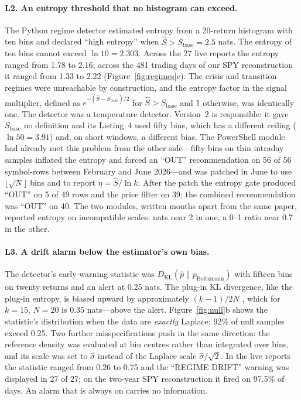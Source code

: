 \documentclass[11pt]{article}
\newcommand{\KL}{D_{\mathrm{KL}}}
\newcommand{\Sb}{S_{\mathrm{base}}}
\begin{document}
\paragraph{L2. An entropy threshold that no histogram can exceed.}
The Python regime detector estimated entropy from a 20-return histogram with ten bins and declared ``high entropy'' when $\hat S>\Sb=2.5$ nats. The entropy of ten bins cannot exceed $\ln10=2.303$. Across the 27 live reports the entropy ranged from 1.78 to 2.16; across the 481 trading days of our SPY reconstruction it ranged from 1.33 to 2.22 (Figure~\ref{fig:regimes}c). The crisis and transition regimes were unreachable by construction, and the entropy factor in the signal multiplier, defined as $e^{-(\hat S-\Sb)/2}$ for $\hat S>\Sb$ and $1$ otherwise, was identically one. The detector was a temperature detector. Version~2 is responsible: it gave $\Sb$ no definition and its Listing~4 used fifty bins, which has a different ceiling ($\ln50=3.91$) and, on short windows, a different bias. The PowerShell module had already met this problem from the other side---fifty bins on thin intraday samples inflated the entropy and forced an ``OUT'' recommendation on 56 of 56 symbol-rows between February and June 2026---and was patched in June to use $\lfloor\sqrt N\rfloor$ bins and to report $\eta=\hat S/\ln k$. After the patch the entropy gate produced ``OUT'' on 5 of 49 rows and the price filter on 39; the combined recommendation was ``OUT'' on 40. The two modules, written months apart from the same paper, reported entropy on incompatible scales: nats near 2 in one, a 0--1 ratio near 0.7 in the other.

\paragraph{L3. A drift alarm below the estimator's own bias.}
The detector's early-warning statistic was $\KL(\hat p\|p_{\mathrm{Boltzmann}})$ with fifteen bins on twenty returns and an alert at 0.25 nats. The plug-in KL divergence, like the plug-in entropy, is biased upward by approximately $(k-1)/2N$ \citep{miller1955,paninski2003}, which for $k=15$, $N=20$ is $0.35$ nats---above the alert. Figure~\ref{fig:null}b shows the statistic's distribution when the data are \emph{exactly} Laplace: 92\% of null samples exceed 0.25. Two further misspecifications push in the same direction: the reference density was evaluated at bin centres rather than integrated over bins, and its scale was set to $\hat\sigma$ instead of the Laplace scale $\hat\sigma/\sqrt2$. In the live reports the statistic ranged from 0.26 to 0.75 and the ``REGIME DRIFT'' warning was displayed in 27 of 27; on the two-year SPY reconstruction it fired on 97.5\% of days. An alarm that is always on carries no information.
\end{document}

